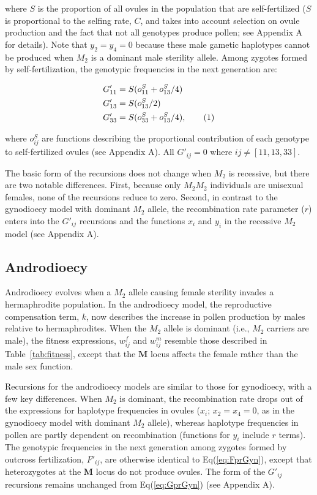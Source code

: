 \documentclass{article}
\newcommand\numberthis{\addtocounter{equation}{1}\tag{\theequation}}
\begin{document}
\noindent where $S$ is the proportion of all ovules in the population that are self-fertilized ($S$ is proportional to the selfing rate, $C$, and takes into account selection on ovule production and the fact that not all genotypes produce pollen; see Appendix A for details). Note that $y_2=y_4=0$ because these male gametic haplotypes cannot be produced when $M_2$ is a dominant male sterility allele. Among zygotes formed by self-fertilization, the genotypic frequencies in the next generation are: 
\begin{linenomath}\begin{align*} \label{eq:GprGyn}
    G'_{11} &= S (o^S_{11} + o^S_{13}/4) \\
    G'_{13} &= S (o^S_{13}/2) \\
    G'_{33} &= S (o^S_{33} + o^S_{13}/4), \numberthis
\end{align*} \end{linenomath}

\noindent where $o^S_{ij}$ are functions describing the proportional contribution of each genotype to self-fertilized ovules (see Appendix A). All $G'_{ij} = 0$ where $ij \neq [11,13,33]$. 

The basic form of the recursions does not change when $M_2$ is recessive, but there are two notable differences. First, because only $M_2M_2$ individuals are unisexual females, none of the recursions reduce to zero. Second, in contrast to the gynodioecy model with dominant $M_2$ allele, the recombination rate parameter ($r$) enters into the $G'_{ij}$ recursions and the functions $x_i$ and $y_i$ in the recessive $M_2$ model (see Appendix A).


\subsection*{Androdioecy}

Androdioecy evolves when a $M_2$ allele causing female sterility invades a hermaphrodite population. In the androdioecy model, the reproductive compensation term, $k$, now describes the increase in pollen production by males relative to hermaphrodites. When the $M_2$ allele is dominant (i.e., $M_2$ carriers are male), the fitness expressions, $w^f_{ij}$ and $w^m_{ij}$ resemble those described in Table~\ref{tab:fitness}, except that the $\mathbf{M}$ locus affects the female rather than the male sex function. 

Recursions for the androdioecy models are similar to those for gynodioecy, with a few key differences. When $M_2$ is dominant, the recombination rate drops out of the expressions for haplotype frequencies in ovules ($x_i$; $x_2=x_4=0$, as in the gynodioecy model with dominant $M_2$ allele), whereas haplotype frequencies in pollen are partly dependent on recombination (functions for $y_i$ include $r$ terms). The genotypic frequencies in the next generation among zygotes formed by outcross fertilization, $F'_{ij}$, are otherwise identical to Eq(\ref{eq:FprGyn}), except that heterozygotes at the $\mathbf{M}$ locus do not produce ovules. The form of the $G'_{ij}$ recursions remains unchanged from Eq(\ref{eq:GprGyn}) (see Appendix A).
\end{document}
